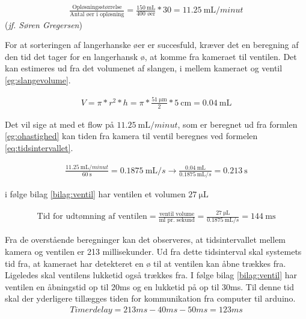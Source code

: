 \begin{align}
\frac{\text{Opløsningsstørrelse}}{\text{Antal øer i opløsning}} = \frac{\SI{150}{\milli\liter}}{400\text{ øer}}*30 = \SI{11,25}{\milli\liter/minut} 
\label{eg:ohastighed}
\end{align}(\textit{jf. Søren Gregersen})

For at sorteringen af langerhanske øer er succesfuld, kræver det en beregning af den tid det tager for en langerhansk ø, at komme fra kameraet til ventilen. Det kan estimeres ud fra det volumenet af slangen, i mellem kameraet og ventil \ref{eg:slangevolume}.

\begin{align}
V=\pi*r^2*h=\pi*\frac{\SI{51}{\micro\metre}}{2}*\SI{5}{\centi\metre}=\SI{0,04}{\milli\liter}
\label{eg:slangevolume}
\end{align}

 Det vil sige at med et flow på $\SI{11,25}{\milli\liter/minut}$, som er beregnet ud fra formlen \ref{eg:ohastighed} kan tiden fra kamera til ventil beregnes ved formelen \ref{eq:tidsintervallet}. 
 
\begin{align}
\frac{\SI{11,25}{\milli\liter/minut}}{\SI{60}{\second}}=\SI{0,1875}{\milli\liter/s}\to\frac{\SI{0,04}{\milli\liter}}{\SI{0,1875}{\milli\liter/s}}=\SI{0.213}{\second}
\label{eq:tidsintervallet}
\end{align} 

i følge bilag \ref{bilag:ventil} har ventilen et volumen $\SI{27}{\micro\liter}$

\begin{align}
\text{Tid for udtømning af ventilen} = \frac{\text{ventil volume}}{\text{ml pr. sekund}}=\frac{\SI{27}{\micro\liter}}{\SI{0,1875}{\milli\liter/s}}=\SI{144}{\milli\second}
\label{eq:ventilvolume}
\end{align}

Fra de overstående beregninger kan det observeres, at tidsintervallet mellem kamera og ventilen er 213 millisekunder. Ud fra dette tidsinterval skal systemets tid fra, at kameraet har detekteret en ø til at ventilen kan åbne trækkes fra. Ligeledes skal ventilens lukketid også trækkes fra. I følge bilag \ref{bilag:ventil} har ventilen en åbningstid op til 20ms og en lukketid på op til 30ms. Til denne tid skal der yderligere tillægges tiden for kommunikation fra computer til arduino.
\begin{align}
Timerdelay=213ms-40ms-50ms=123ms
\label{eq:timerdelay}
\end{align} 

